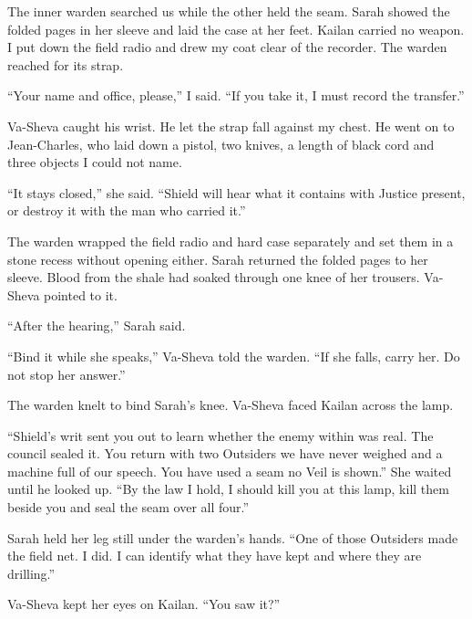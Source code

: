 The inner warden searched us while the other held the seam. Sarah showed the folded pages in her sleeve and laid the case at her feet. Kailan carried no weapon. I put down the field radio and drew my coat clear of the recorder. The warden reached for its strap.\par

``Your name and office, please,'' I said. ``If you take it, I must record the transfer.''\par

Va-Sheva caught his wrist. He let the strap fall against my chest. He went on to Jean-Charles, who laid down a pistol, two knives, a length of black cord and three objects I could not name.\par

``It stays closed,'' she said. ``Shield will hear what it contains with Justice present, or destroy it with the man who carried it.''\par

The warden wrapped the field radio and hard case separately and set them in a stone recess without opening either. Sarah returned the folded pages to her sleeve. Blood from the shale had soaked through one knee of her trousers. Va-Sheva pointed to it.\par

``After the hearing,'' Sarah said.\par

``Bind it while she speaks,'' Va-Sheva told the warden. ``If she falls, carry her. Do not stop her answer.''\par

The warden knelt to bind Sarah's knee. Va-Sheva faced Kailan across the lamp.\par

``Shield's writ sent you out to learn whether the enemy within was real. The council sealed it. You return with two Outsiders we have never weighed and a machine full of our speech. You have used a seam no Veil is shown.'' She waited until he looked up. ``By the law I hold, I should kill you at this lamp, kill them beside you and seal the seam over all four.''\par

Sarah held her leg still under the warden's hands. ``One of those Outsiders made the field net. I did. I can identify what they have kept and where they are drilling.''\par

Va-Sheva kept her eyes on Kailan. ``You saw it?''\par

